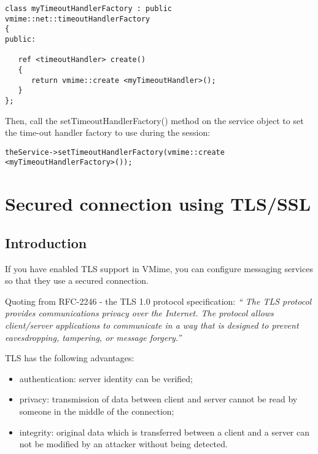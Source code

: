 \begin{lstlisting}
class myTimeoutHandlerFactory : public vmime::net::timeoutHandlerFactory
{
public:

   ref <timeoutHandler> create()
   {
      return vmime::create <myTimeoutHandler>();
   }
};
\end{lstlisting}

Then, call the {\vcode setTimeoutHandlerFactory()} method on the service object
to set the time-out handler factory to use during the session:

\begin{lstlisting}
theService->setTimeoutHandlerFactory(vmime::create <myTimeoutHandlerFactory>());
\end{lstlisting}


\newpage
\section{Secured connection using TLS/SSL}

\subsection{Introduction} %

If you have enabled TLS support in VMime, you can configure messaging services
so that they use a secured connection.

Quoting from RFC-2246 - the TLS 1.0 protocol specification: \emph{`` The TLS
protocol provides communications privacy over the Internet. The protocol
allows client/server applications to communicate in a way that is designed
to prevent eavesdropping, tampering, or message forgery.''}

TLS has the following advantages:

\begin{itemize}
\item authentication: server identity can be verified;
\item privacy: transmission of data between client and server cannot be read
by someone in the middle of the connection;
\item integrity: original data which is transferred between a client and a
server can not be modified by an attacker without being detected.
\end{itemize}


